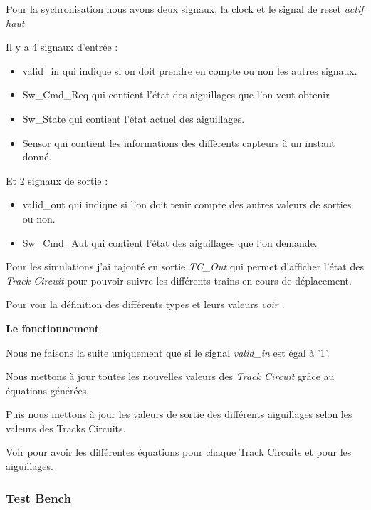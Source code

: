 Pour la sychronisation nous avons deux signaux, la clock et le signal
de reset \emph{actif haut}.

Il y a 4 signaux d'entrée :

\begin{itemize}
  \item valid\_in qui indique si on doit prendre en compte ou non les
    autres signaux.
  \item Sw\_Cmd\_Req qui contient l'état des aiguillages que l'on veut obtenir
  \item Sw\_State qui contient l'état actuel des aiguillages.
  \item Sensor qui contient les informations des différents capteurs à
    un instant donné.
\end{itemize}  

\medskip

Et 2 signaux de sortie :

\begin{itemize}
  \item valid\_out qui indique si l'on doit tenir compte des autres
    valeurs de sorties ou non.
  \item Sw\_Cmd\_Aut qui contient l'état des aiguillages que l'on demande.
\end{itemize}  

\medskip

Pour les simulations j'ai rajouté en sortie \emph{TC\_Out} qui permet
d'afficher l'état des \emph{Track Circuit} pour pouvoir suivre les
différents trains en cours de déplacement.

Pour voir la définition des différents types et leurs valeurs \emph{voir \cite{interface}}.

\bigskip

\textbf{Le fonctionnement}

Nous ne faisons la suite uniquement que si le signal \emph{valid\_in} est égal à '1'.

Nous mettons à jour toutes les nouvelles valeurs des \emph{Track
  Circuit} grâce au équations générées.

Puis nous mettons à jour les valeurs de sortie des différents
aiguillages selon les valeurs des Tracks Circuits.

\smallskip

Voir \cite{interface} pour avoir les différentes équations pour chaque Track
Circuits et pour les aiguillages.

\subsubsection{\underline{Test Bench}}
\label{sec:Test_Bench}

